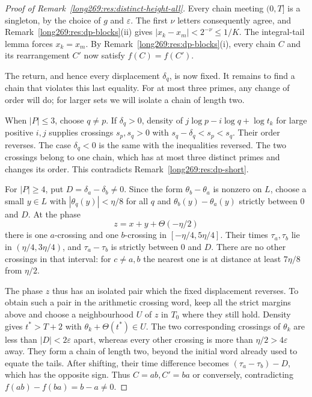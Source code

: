 \begin{proof}[Proof of Remark~\ref{long269:res:distinct-height-all}]
Every chain meeting $(0,T]$ is a singleton, by the choice of $g$ and
$\varepsilon$. The first $\nu$ letters consequently agree, and
Remark~\ref{long269:res:dp-blocks}(ii) gives
$|x_k-x_m|<2^{-\nu}\le1/K$. The integral-tail lemma forces $x_k=x_m$.
By Remark~\ref{long269:res:dp-blocks}(i), every chain $C$ and its rearrangement $C'$
now satisfy $f(C)=f(C')$.

The return, and hence every displacement $\delta_q$, is now fixed.
It remains to find a chain that violates this last equality. For at
most three primes, any change of order will do; for larger sets we
will isolate a chain of length two.

When $|P|\le3$, choose $q\ne p$. If $\delta_q>0$, density of
$j\log p-i\log q+\log t_k$ for large positive $i,j$ supplies crossings
$s_p,s_q>0$ with $s_q-\delta_q<s_p<s_q$. Their order reverses. The case
$\delta_q<0$ is the same with the inequalities reversed. The two crossings
belong to one chain, which has at most three distinct primes and changes
its order. This contradicts Remark~\ref{long269:res:dp-short}.

For $|P|\ge4$, put $D=\delta_a-\delta_b\ne0$. Since the form
$\theta_b-\theta_a$ is nonzero on $L$, choose a small $y\in L$ with
$|\theta_q(y)|<\eta/8$ for all $q$ and
$\theta_b(y)-\theta_a(y)$ strictly between $0$ and $D$.
At the phase
\[
 z=x+y+\Theta(-\eta/2)
\]
there is one $a$-crossing and one $b$-crossing in
$[-\eta/4,5\eta/4]$. Their times $\tau_a,\tau_b$ lie in
$(\eta/4,3\eta/4)$, and $\tau_a-\tau_b$ is strictly between $0$ and $D$.
There are no other crossings in that interval: for $c\ne a,b$ the nearest
one is at distance at least $7\eta/8$ from $\eta/2$.

The phase $z$ thus has an isolated pair which the fixed displacement
reverses. To obtain such a pair in the arithmetic crossing word, keep
all the strict margins above and choose a neighbourhood $U$ of $z$ in
$T_0$ where they still hold. Density gives $t^*>T+2$ with
$\theta_k+\Theta(t^*)\in U$. The two corresponding crossings of
$\theta_k$ are less than $|D|<2\varepsilon$ apart, whereas every other
crossing is more than $\eta/2>4\varepsilon$ away. They form a chain of
length two, beyond the initial word already used to equate the tails.
After shifting, their time difference becomes
$(\tau_a-\tau_b)-D$, which has the opposite sign. Thus $C=ab,C'=ba$
or conversely, contradicting $f(ab)-f(ba)=b-a\ne0$.
\end{proof}

